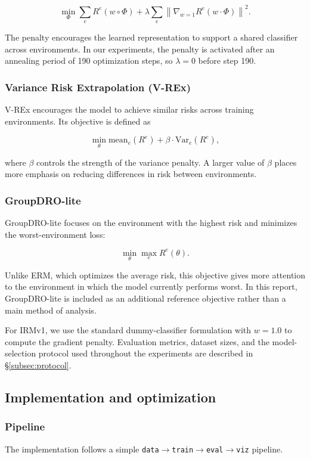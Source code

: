 \documentclass[12pt,a4paper]{article}
\begin{document}
\[
\min_\Phi
\sum_e R^e(w \circ \Phi)
+
\lambda
\sum_e
\left\|
\nabla_{w=1} R^e(w \cdot \Phi)
\right\|^2.
\]

The penalty encourages the learned representation to support a shared classifier
across environments. In our experiments, the penalty is activated after an annealing
period of 190 optimization steps, so $\lambda=0$ before step 190.

\subsubsection{Variance Risk Extrapolation (V-REx)}
V-REx encourages the model to achieve similar risks across training environments.
Its objective is defined as

\[
\min_\theta
\mathrm{mean}_e\left(R^e\right)
+
\beta
\cdot
\mathrm{Var}_e\left(R^e\right),
\]

where $\beta$ controls the strength of the variance penalty. A larger value of
$\beta$ places more emphasis on reducing differences in risk between environments.

\subsubsection{GroupDRO-lite}
GroupDRO-lite focuses on the environment with the highest risk and minimizes the
worst-environment loss:

\[
\min_\theta
\max_e R^e(\theta).
\]

Unlike ERM, which optimizes the average risk, this objective gives more attention to
the environment in which the model currently performs worst. In this report,
GroupDRO-lite is included as an additional reference objective rather than a main
method of analysis.

For IRMv1, we use the standard dummy-classifier formulation with $w=1.0$ to compute
the gradient penalty. Evaluation metrics, dataset sizes, and the model-selection
protocol used throughout the experiments are described in
\S\ref{subsec:protocol}.
\begingroup
{}
\subsection{Implementation and optimization}
\label{sec:method}

\subsubsection{Pipeline}
The implementation follows a simple
\texttt{data}$\rightarrow$\texttt{train}$\rightarrow$\texttt{eval}$\rightarrow$\texttt{viz}
pipeline.
\end{document}
